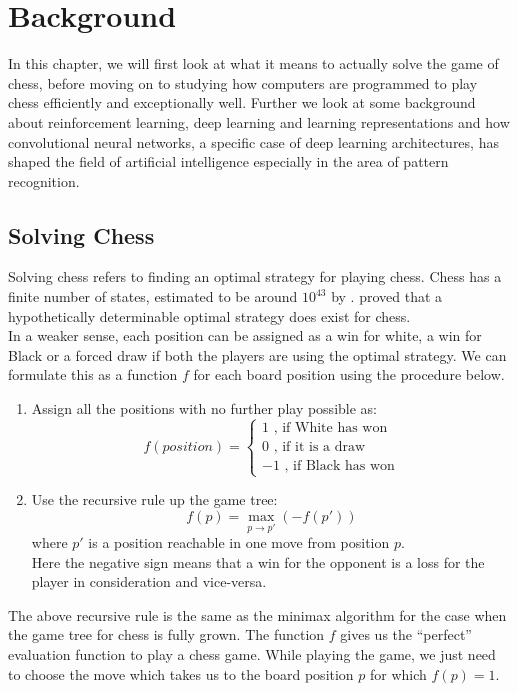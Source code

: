 \chapter{Background}
\label{chap:background}
In this chapter, we will first look at what it means to actually solve the game 
of chess, before moving on to studying how computers are programmed to play 
chess efficiently and exceptionally well. Further we look at some background 
about reinforcement learning, deep learning and 
learning representations and how 
convolutional neural networks, a specific case of deep learning architectures, 
has shaped the field of artificial intelligence especially in the area of 
pattern recognition.%
\section*{Solving Chess}
\label{section:solving}
Solving chess refers to finding an optimal strategy for playing chess. Chess has 
a finite number of states, estimated to be around $10^{43}$ 
by \citet{shannon1950xxii}. \citet{zermelo1913anwendung} proved that a 
hypothetically determinable optimal strategy does exist for chess.\\
In a weaker sense, each position can be assigned as a win for white, a win for 
Black or a forced draw if both the players are using the optimal strategy. We 
can formulate this as a function $f$ for each board position using the procedure 
below.
\begin{enumerate}
\item Assign all the positions with no further play possible as:
\[f(position) = \begin{cases}
1 \text{ , if White has won}\\
0 \text{ , if it is a draw}\\
-1 \text{ , if Black has won}
\end{cases}\]
\item Use the recursive rule up the game tree:
\[f(p) = \max\limits_{p\rightarrow p'} (-f(p'))\]
where $p'$ is a position reachable in one move from position $p$.\\
Here the negative sign means that a win for the opponent is a loss for the 
player in consideration and vice-versa.
\end{enumerate} 
The above recursive rule is the same as the minimax algorithm for the case when 
the game tree for chess is fully grown. The function $f$ gives us the 
``perfect'' evaluation function to play a chess game. While playing the game, we 
just need to choose the move which takes us to the board position $p$ for which 
$f(p)=1$.\\

